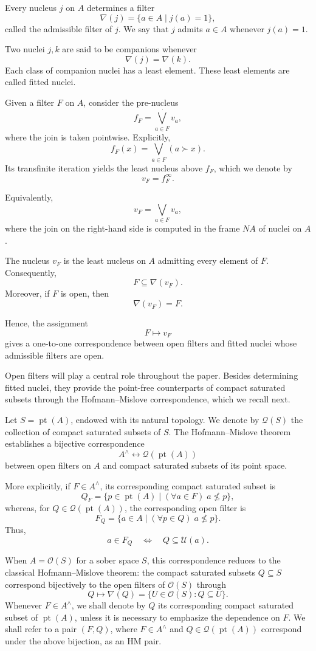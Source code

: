 \documentclass[11pt]{amsart}
\DeclareMathOperator{\pt}{pt}
\theoremstyle{plain}
\theoremstyle{definition}
\begin{document}
Every nucleus \(j\) on \(A\) determines a filter
\[
\nabla(j)=\{a\in A\mid j(a)=1\},
\]
called the admissible filter of \(j\). We say that \(j\) admits \(a\in A\) whenever \(j(a)=1\).

Two nuclei \(j,k\) are said to be companions whenever
\[
\nabla(j)=\nabla(k).
\]
Each class of companion nuclei has a least element. These least elements are called fitted nuclei.

Given a filter \(F\) on \(A\), consider the pre-nucleus
\[
f_F=\bigvee_{a\in F}^{\,\boldsymbol{\cdot}}v_a,
\]
where the join is taken pointwise. Explicitly,
\[
f_F(x)=\bigvee_{a\in F}(a\succ x).
\]
Its transfinite iteration yields the least nucleus above \(f_F\), which we denote by
\[
v_F=f_F^\infty.
\]

Equivalently,
\[
v_F=\bigvee_{a\in F}v_a,
\]
where the join on the right-hand side is computed in the frame \(NA\) of nuclei on \(A\).

The nucleus \(v_F\) is the least nucleus on \(A\) admitting every element of \(F\). Consequently,
\[
F\subseteq\nabla(v_F).
\]
Moreover, if \(F\) is open, then
\[
\nabla(v_F)=F.
\]

Hence, the assignment
\[
F\longmapsto v_F
\]
gives a one-to-one correspondence between open filters and fitted nuclei whose admissible filters are open.

Open filters will play a central role throughout the paper. Besides determining fitted nuclei, they provide the point-free counterparts of compact saturated subsets through the Hofmann--Mislove correspondence, which we recall next.

Let \(S=\pt(A)\), endowed with its natural topology. We denote by \(\mathcal Q(S)\) the collection of compact saturated subsets of \(S\). The Hofmann--Mislove theorem establishes a bijective correspondence
\[
A^\wedge\longleftrightarrow\mathcal Q(\pt(A))
\]
between open filters on \(A\) and compact saturated subsets of its point space.

More explicitly, if \(F\in A^\wedge\), its corresponding compact saturated subset is
\[
Q_F=\{p\in\pt(A)\mid(\forall a\in F)\;a\nleq p\},
\]
whereas, for \(Q\in\mathcal Q(\pt(A))\), the corresponding open filter is
\[
F_Q=\{a\in A\mid(\forall p\in Q)\;a\nleq p\}.
\]
Thus,
\[
a\in F_Q
\quad\Longleftrightarrow\quad
Q\subseteq\mathcal U(a).
\]

When \(A=\mathcal O(S)\) for a sober space \(S\), this correspondence reduces to the classical Hofmann--Mislove theorem: the compact saturated subsets \(Q\subseteq S\) correspond bijectively to the open filters of \(\mathcal O(S)\) through
\[
Q\longmapsto\nabla(Q)
=\{U\in\mathcal O(S):Q\subseteq U\}.
\]
Whenever \(F\in A^\wedge\), we shall denote by \(Q\) its corresponding compact saturated subset of \(\pt(A)\), unless it is necessary to emphasize the dependence on \(F\). 
We shall refer to a pair \((F,Q)\), where \(F\in A^\wedge\) and \(Q\in\mathcal Q(\pt(A))\) correspond under the above bijection, as an HM pair.
\end{document}
